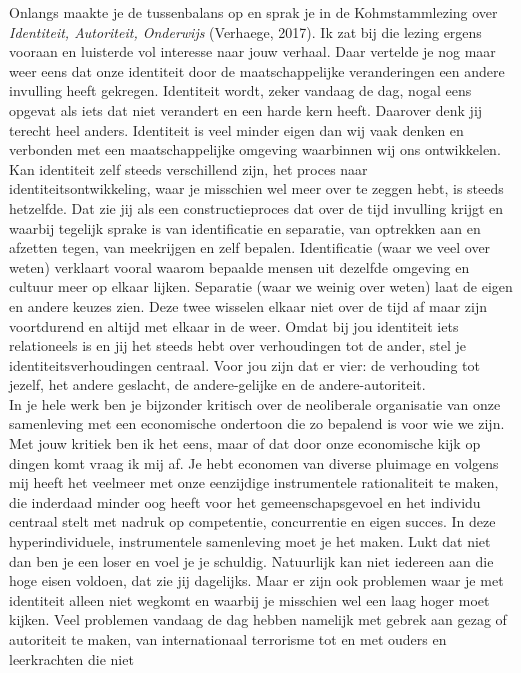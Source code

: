 \documentclass[]{book}
\begin{document}
Onlangs maakte je de tussenbalans op en sprak je in de Kohmstammlezing
over \emph{Identiteit, Autoriteit, Onderwijs} (Verhaege, 2017). Ik zat
bij die lezing ergens vooraan en luisterde vol interesse naar jouw
verhaal. Daar vertelde je nog maar weer eens dat onze identiteit door de
maatschappelijke veranderingen een andere invulling heeft gekregen.
Identiteit wordt, zeker vandaag de dag, nogal eens opgevat als iets dat
niet verandert en een harde kern heeft. Daarover denk jij terecht heel
anders. Identiteit is veel minder eigen dan wij vaak denken en verbonden
met een maatschappelijke omgeving waarbinnen wij ons ontwikkelen. Kan
identiteit zelf steeds verschillend zijn, het proces naar
identiteitsontwikkeling, waar je misschien wel meer over te zeggen hebt,
is steeds hetzelfde. Dat zie jij als een constructieproces dat over de
tijd invulling krijgt en waarbij tegelijk sprake is van identificatie en
separatie, van optrekken aan en afzetten tegen, van meekrijgen en zelf
bepalen. Identificatie (waar we veel over weten) verklaart vooral waarom
bepaalde mensen uit dezelfde omgeving en cultuur meer op elkaar lijken.
Separatie (waar we weinig over weten) laat de eigen en andere keuzes
zien. Deze twee wisselen elkaar niet over de tijd af maar zijn
voortdurend en altijd met elkaar in de weer. Omdat bij jou identiteit
iets relationeels is en jij het steeds hebt over verhoudingen tot de
ander, stel je identiteitsverhoudingen centraal. Voor jou zijn dat er
vier: de verhouding tot jezelf, het andere geslacht, de andere-gelijke
en de andere-autoriteit.\\
In je hele werk ben je bijzonder kritisch over de neoliberale
organisatie van onze samenleving met een economische ondertoon die zo
bepalend is voor wie we zijn. Met jouw kritiek ben ik het eens, maar of
dat door onze economische kijk op dingen komt vraag ik mij af. Je hebt
economen van diverse pluimage en volgens mij heeft het veelmeer met onze
eenzijdige instrumentele rationaliteit te maken, die inderdaad minder
oog heeft voor het gemeenschapsgevoel en het individu centraal stelt met
nadruk op competentie, concurrentie en eigen succes. In deze
hyperindividuele, instrumentele samenleving moet je het maken. Lukt dat
niet dan ben je een loser en voel je je schuldig. Natuurlijk kan niet
iedereen aan die hoge eisen voldoen, dat zie jij dagelijks. Maar er zijn
ook problemen waar je met identiteit alleen niet wegkomt en waarbij je
misschien wel een laag hoger moet kijken. Veel problemen vandaag de dag
hebben namelijk met gebrek aan gezag of autoriteit te maken, van
internationaal terrorisme tot en met ouders en leerkrachten die niet
\end{document}
